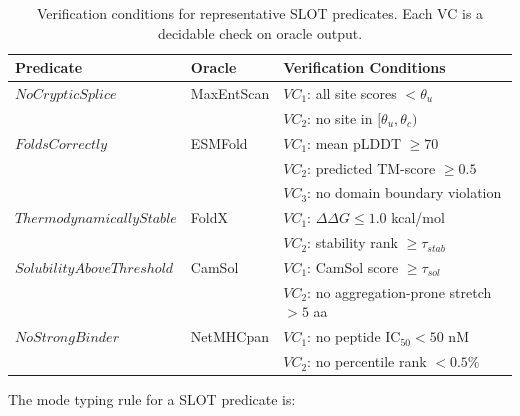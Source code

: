 \begin{table}[t]
\centering
\caption{Verification conditions for representative SLOT predicates.
         Each VC is a decidable check on oracle output.}
\label{tab:vcs}
\begin{tabular}{llp{5.2cm}}
\toprule
\textbf{Predicate} & \textbf{Oracle} & \textbf{Verification Conditions} \\
\midrule
$\mathit{NoCrypticSplice}$ & MaxEntScan &
  $\mathit{VC}_1$: all site scores $< \theta_u$ \\
 & &
  $\mathit{VC}_2$: no site in $[\theta_u, \theta_c)$ \\
\midrule
$\mathit{FoldsCorrectly}$ & ESMFold &
  $\mathit{VC}_1$: mean pLDDT $\ge 70$ \\
 & &
  $\mathit{VC}_2$: predicted TM-score $\ge 0.5$ \\
 & &
  $\mathit{VC}_3$: no domain boundary violation \\
\midrule
$\mathit{ThermodynamicallyStable}$ & FoldX &
  $\mathit{VC}_1$: $\Delta\Delta G \le 1.0$ kcal/mol \\
 & &
  $\mathit{VC}_2$: stability rank $\ge \tau_{\mathit{stab}}$ \\
\midrule
$\mathit{SolubilityAboveThreshold}$ & CamSol &
  $\mathit{VC}_1$: CamSol score $\ge \tau_{\mathit{sol}}$ \\
 & &
  $\mathit{VC}_2$: no aggregation-prone stretch $> 5$ aa \\
\midrule
$\mathit{NoStrongBinder}$ & NetMHCpan &
  $\mathit{VC}_1$: no peptide IC$_{50} < 50$ nM \\
 & &
  $\mathit{VC}_2$: no percentile rank $< 0.5\%$ \\
\bottomrule
\end{tabular}
\end{table}

The \VERIFIED{} mode typing rule for a SLOT predicate is:


